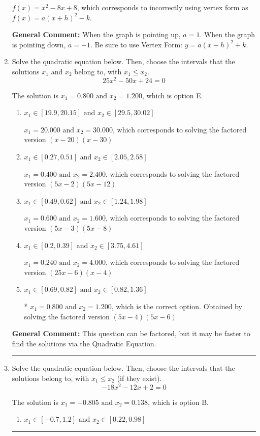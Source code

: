 \documentclass{extbook}[14pt]
\newcommand{\litem}[1]{\item #1

\rule{\textwidth}{0.4pt}}
\begin{document}
\begin{enumerate}
{\begin{enumerate}[label=\Alph*.]
$f(x)=x^{2} -8 x + 8$, which corresponds to incorrectly using vertex form as $f(x) = a(x+h)^2 - k$.
\end{enumerate}

\textbf{General Comment:} When the graph is pointing up, $a=1$. When the graph is pointing down, $a=-1$. Be sure to use Vertex Form: $y = a(x-h)^2+k$.
}
\litem{
Solve the quadratic equation below. Then, choose the intervals that the solutions $x_1$ and $x_2$ belong to, with $x_1 \leq x_2$.
\[ 25x^{2} -50 x + 24 = 0 \]

The solution is \( x_1 = 0.800 \text{ and } x_2 = 1.200 \), which is option E.\begin{enumerate}[label=\Alph*.]
\item \( x_1 \in [19.9, 20.15] \text{ and } x_2 \in [29.5, 30.02] \)

$x_1 = 20.000 \text{ and } x_2 = 30.000$, which corresponds to solving the factored version $(x -20)(x -30)$
\item \( x_1 \in [0.27, 0.51] \text{ and } x_2 \in [2.05, 2.58] \)

$x_1 = 0.400 \text{ and } x_2 = 2.400$, which corresponds to solving the factored version $(5x -2)(5x -12)$
\item \( x_1 \in [0.49, 0.62] \text{ and } x_2 \in [1.24, 1.98] \)

$x_1 = 0.600 \text{ and } x_2 = 1.600$, which corresponds to solving the factored version $(5x -3)(5x -8)$
\item \( x_1 \in [0.2, 0.39] \text{ and } x_2 \in [3.75, 4.61] \)

$x_1 = 0.240 \text{ and } x_2 = 4.000$, which corresponds to solving the factored version $(25x -6)(x -4)$
\item \( x_1 \in [0.69, 0.82] \text{ and } x_2 \in [0.82, 1.36] \)

* $x_1 = 0.800 \text{ and } x_2 = 1.200$, which is the correct option. Obtained by solving the factored version $(5x -4)(5x -6)$
\end{enumerate}

\textbf{General Comment:} This question can be factored, but it may be faster to find the solutions via the Quadratic Equation.
}
\litem{
Solve the quadratic equation below. Then, choose the intervals that the solutions belong to, with $x_1 \leq x_2$ (if they exist).
\[ -18x^{2} -12 x + 2 = 0 \]

The solution is \( x_1 = -0.805 \text{ and } x_2 = 0.138 \), which is option B.\begin{enumerate}[label=\Alph*.]
\item \( x_1 \in [-0.7, 1.2] \text{ and } x_2 \in [0.22, 0.98] \)


\end{enumerate}}
\end{enumerate}
\end{document}
